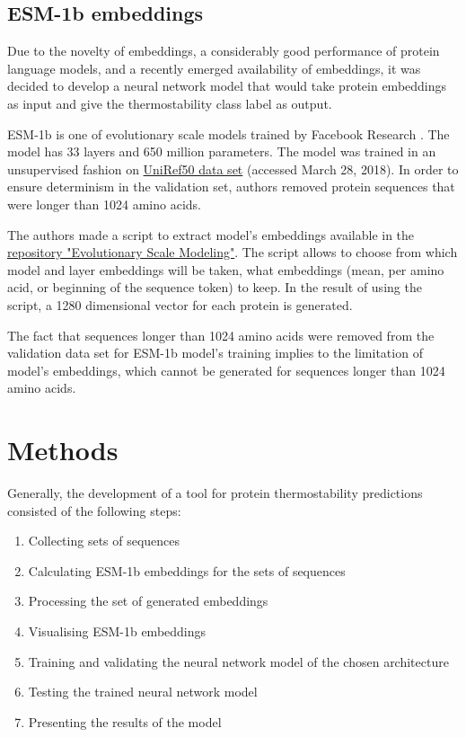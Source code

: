 \documentclass[12pt]{article}
\begin{document}
	\subsection{ESM-1b embeddings}

	Due to the novelty of embeddings, a considerably good performance of
	protein language models, and a recently emerged availability of embeddings,
	it was decided to develop a neural network model that would take protein
	embeddings as input and give the thermostability class
	label as output.

	ESM-1b is one of evolutionary scale models trained by Facebook Research 
	\cite{rives2021biological}. The model has 33 layers and 650 million parameters. 
	The model was trained in an 
	unsupervised fashion on 
	\href{ftp://ftp.uniprot.org/pub/databases/uniprot/uniref/uniref50}{UniRef50 data set}
	(accessed March 28, 2018)\cite{suzek2015uniref}. In order 
	to ensure
	determinism in the validation set, authors removed protein sequences that
	were longer than 1024 amino acids. 

	The authors made a script to extract model's embeddings available in the 
	\href{https://github.com/facebookresearch/esm}{repository "Evolutionary Scale Modeling"}.
	The script allows to choose 
	from which model and layer embeddings will be taken, what embeddings 
	(mean, per amino acid, or beginning of the sequence token) to keep. In the
	result of using the script, a 1280 dimensional vector for each protein is 
	generated.
	
	The fact that sequences longer than 1024 amino acids were removed from the 
	validation data set for ESM-1b model's training implies to the limitation of 
	model's embeddings, which cannot be generated for sequences longer than 
	1024 amino acids.

	\newpage

	\section{Methods}

	Generally, the development of a tool for protein thermostability predictions
	consisted of the following steps:

	\begin{enumerate}
		\item Collecting sets of sequences
		\item Calculating ESM-1b embeddings for the sets of sequences
		\item Processing the set of generated embeddings
		\item Visualising ESM-1b embeddings
		\item Training and validating the neural network model of the chosen architecture 
		\item Testing the trained neural network model
		\item Presenting the results of the model
	\end{enumerate}
\end{document}
